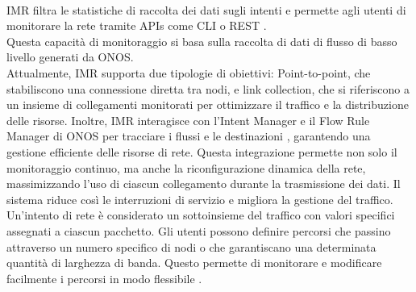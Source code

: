 \\IMR filtra le statistiche di raccolta dei dati sugli intenti e permette agli utenti di monitorare la rete tramite APIs come CLI o REST \cite{ONOSart}. 
\\Questa capacità di monitoraggio si basa sulla raccolta di dati di flusso di basso livello generati da ONOS. 
\\Attualmente, IMR supporta due tipologie di obiettivi: Point-to-point, che stabiliscono una connessione diretta tra nodi, e 
link collection, che si riferiscono a un insieme di collegamenti monitorati per ottimizzare il traffico e la distribuzione delle risorse.
Inoltre, IMR interagisce con l'Intent Manager e il Flow Rule Manager di ONOS per tracciare i flussi e le destinazioni \cite{onosint}, garantendo una gestione efficiente delle risorse di rete. 
Questa integrazione permette non solo il monitoraggio continuo, ma anche la riconfigurazione dinamica della rete, massimizzando l'uso di ciascun collegamento durante la trasmissione dei dati.
Il sistema riduce così le interruzioni di servizio e migliora la gestione del traffico.
\\Un'intento di rete è considerato un sottoinsieme del traffico con valori specifici assegnati a ciascun pacchetto.
Gli utenti possono definire percorsi che passino attraverso un numero specifico di nodi o che garantiscano una determinata quantità di larghezza di banda. 
Questo permette di monitorare e modificare facilmente i percorsi in modo flessibile \cite{ONOSart}.

